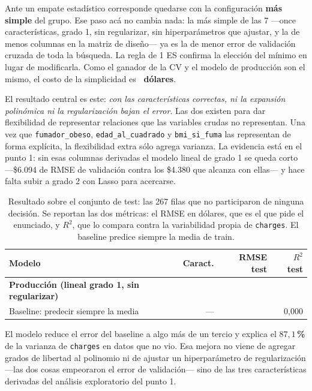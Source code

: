 \documentclass[11pt,a4paper]{article}
\newcommand{\destacado}[1]{\textcolor{azulserie}{\textbf{#1}}}
\begin{document}
Ante un empate estadístico corresponde quedarse con la configuración \textbf{más simple} del
grupo. Ese paso acá no cambia nada: la más simple de las 7 ---once características, grado 1,
sin regularizar, sin hiperparámetros que ajustar, y la de menos columnas en la matriz de
diseño--- ya es la de menor error de validación cruzada de toda la búsqueda. La regla de 1 ES
confirma la elección del mínimo en lugar de modificarla. Como el ganador de la CV y el modelo
de producción son el mismo, el costo de la simplicidad es \destacado{\costosimplicidad\
dólares}.

El resultado central es este: \emph{con las características correctas, ni la expansión
polinómica ni la regularización bajan el error}. Las dos existen para dar flexibilidad de
representar relaciones que las variables crudas no representan. Una vez que
\texttt{fumador\_obeso}, \texttt{edad\_al\_cuadrado} y \texttt{bmi\_si\_fuma} las representan
de forma explícita, la flexibilidad extra sólo agrega varianza. La evidencia está en el punto
1: sin esas columnas derivadas el modelo lineal de grado 1 se queda corto ---\$6.094 de RMSE
de validación contra los \$4.380 que alcanza con ellas--- y hace falta subir a grado 2 con
Lasso para acercarse.

\begin{table}[H]
\centering
\caption{Resultado sobre el conjunto de test: las 267 filas que no participaron de ninguna
decisión. Se reportan las dos métricas: el RMSE en dólares, que es el que pide el enunciado, y
$R^2$, que lo compara contra la variabilidad propia de \texttt{charges}. El baseline predice
siempre la media de train.}
\label{tab:test}
\begin{tabular}{@{}l r r r@{}}
\toprule
\textbf{Modelo} & \textbf{Caract.} & \textbf{RMSE test} & \textbf{$R^2$ test} \\
\midrule
\textbf{Producción (lineal grado 1, sin regularizar)} & \textbf{\featuresproduccion}
  & \textbf{\rmsetestproduccion} & \textbf{\rdostest} \\
Baseline: predecir siempre la media & --- & \rmsetestbaseline & 0,000 \\
\bottomrule
\end{tabular}
\end{table}

El modelo reduce el error del baseline a algo más de un tercio y explica el
\destacado{$87{,}1$\,\%} de la varianza de \texttt{charges} en datos que no vio. Esa mejora no
viene de agregar grados de libertad al polinomio ni de ajustar un hiperparámetro de
regularización ---las dos cosas empeoraron el error de validación--- sino de las tres
características derivadas del análisis exploratorio del punto 1.
\end{document}
